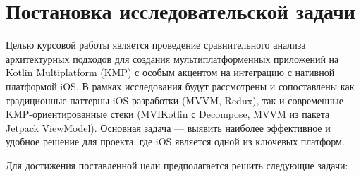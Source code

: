 \documentclass[14pt, russian]{scrartcl}
\begin{document}
\begin{titlepage}
\begin{center}


\end{center}

\end{titlepage}

\setlength{\tabcolsep}{3pt}
\newpage
\setcounter{page}{2}
\renewcommand\contentsname{\hfill{\normalfont{СОДЕРЖАНИЕ}}\hfill}  %
\tableofcontents
\newpage


\section{Постановка исследовательской задачи}

Целью курсовой работы является проведение сравнительного анализа архитектурных подходов для создания мультиплатформенных приложений на Kotlin Multiplatform (KMP) с особым акцентом на интеграцию с нативной платформой iOS. В рамках исследования будут рассмотрены и сопоставлены как традиционные паттерны iOS-разработки (MVVM, Redux), так и современные KMP-ориентированные стеки (MVIKotlin с Decompose, MVVM из пакета Jetpack ViewModel). Основная задача — выявить наиболее эффективное и удобное решение для проекта, где iOS является одной из ключевых платформ.

Для достижения поставленной цели предполагается решить следующие задачи:
\end{document}
